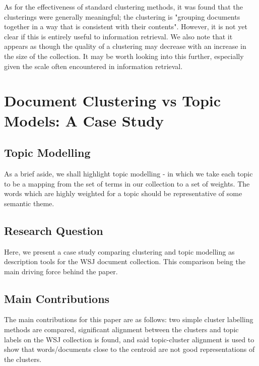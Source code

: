 \documentclass[sigconf,authorversion,nonacm]{acmart}
\begin{document}
As for the effectiveness of standard clustering methods, it was found that the clusterings were generally meaningful; the clustering is "grouping documents together in a way that is consistent with their contents"\cite{Yuan2022}. However, it is not yet clear if this is entirely useful to information retrieval. We also note that it appears as though the quality of a clustering may decrease with an increase in the size of the collection. It may be worth looking into this further, especially given the scale often encountered in information retrieval.
\section{Document Clustering vs Topic Models: A Case Study}
\subsection{Topic Modelling}
As a brief aside, we shall highlight topic modelling - in which we take each topic to be a mapping from the set of terms in our collection to a set of weights. The words which are highly weighted for a topic should be representative of some semantic theme.
\subsection{Research Question}
Here, we present a case study comparing clustering and topic modelling as description tools for the WSJ document collection. This comparison being the main driving force behind the paper.
\subsection{Main Contributions}
The main contributions for this paper are as follows: two simple cluster labelling methods are compared, significant alignment between the clusters and topic labels on the WSJ collection is found, and said topic-cluster alignment is used to show that words/documents close to the centroid are not good representations of the clusters.
\end{document}
